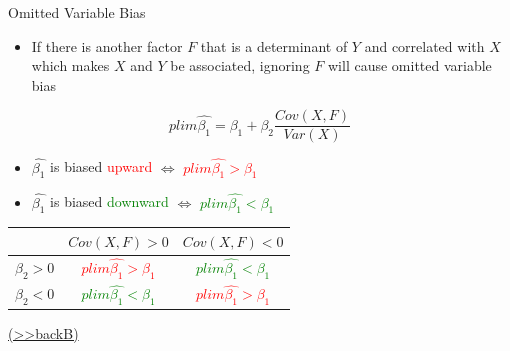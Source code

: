 \documentclass[
  10pt,
  ignorenonframetext,
]{beamer}
\providecommand{\tightlist}{%
  \setlength{\itemsep}{0pt}\setlength{\parskip}{0pt}}
\begin{document}
\begin{frame}{Omitted Variable Bias}
\protect\hypertarget{OVB}{}
\begin{itemize}
\tightlist
\item
  If there is another factor \(F\) that is a determinant of \(Y\) and
  correlated with \(X\) which makes \(X\) and \(Y\) be associated,
  ignoring \(F\) will cause omitted variable bias
\end{itemize}

\[
    plim\hat{\beta_1} = \beta_1 + \beta_2\frac{Cov(X,F)}{Var(X)}
\]

\begin{itemize}
\tightlist
\item
  \(\hat{\beta_1}\) is biased \textcolor{red}{upward} \hspace{3mm}
  \(\Leftrightarrow\) \textcolor{red}{$plim\hat{\beta_1} > \beta_1$}
\item
  \(\hat{\beta_1}\) is biased \textcolor{green}{downward}
  \(\Leftrightarrow\) \textcolor{green}{$plim\hat{\beta_1} < \beta_1$}
\end{itemize}

\vspace{3mm}

\begin{center}
\setlength{\tabcolsep}{3pt}
\begin{tabular}{|c|c|c|}
\hline
& $Cov(X,F) > 0$ & $Cov(X,F) < 0$
\\
\hline
$\beta_2 > 0$ & \textcolor{red}{$plim\hat{\beta_1} > \beta_1$}  & \textcolor{green}{$plim\hat{\beta_1} < \beta_1$} \\
 \hline 
$\beta_2 < 0$ & \textcolor{green}{$plim\hat{\beta_1} < \beta_1$} & \textcolor{red}{$plim\hat{\beta_1} > \beta_1$}
\\ \hline
\end{tabular}
\end{center}

\footnotesize \protect\hyperlink{LRissue}{(\textgreater\textgreater backB)}
\normalsize
\end{frame}
\end{document}
